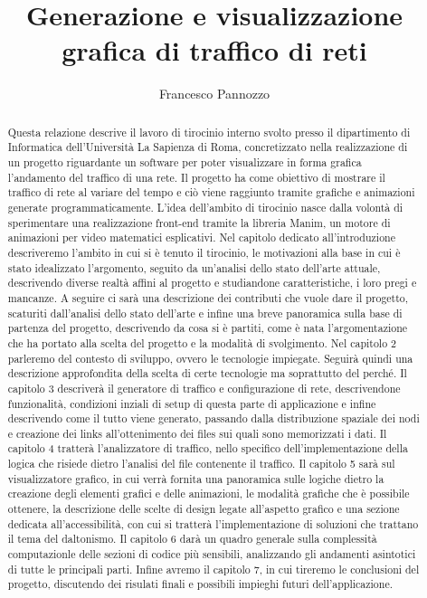 \documentclass[binding=0.6cm]{sapthesis}
\title{Generazione e visualizzazione grafica di traffico di reti}
\author{Francesco Pannozzo}
\begin{document}
\frontmatter
\maketitle
\dedication{Dedicato alla\\ mia famiglia}
\begin{abstract}
Questa relazione descrive il lavoro di tirocinio interno svolto presso il dipartimento di Informatica dell'Università La Sapienza di Roma, 
concretizzato nella realizzazione 
di un progetto riguardante un software per poter visualizzare in forma grafica l'andamento 
del traffico di una rete.
Il progetto ha come obiettivo di mostrare il traffico di rete al variare del tempo e ciò viene raggiunto
tramite grafiche e animazioni generate programmaticamente. L'idea dell'ambito di tirocinio nasce 
dalla volontà di sperimentare una realizzazione front-end tramite la libreria Manim, un motore di animazioni per video
matematici esplicativi. Nel capitolo dedicato all'introduzione descriveremo l'ambito in cui si è tenuto il tirocinio, le motivazioni
alla base in cui è stato idealizzato l'argomento, seguito da un'analisi dello stato dell'arte attuale, descrivendo diverse realtà affini al progetto
e studiandone caratteristiche, i loro pregi e mancanze. A seguire ci sarà una descrizione dei contributi che vuole dare il progetto, scaturiti dall'analisi
dello stato dell'arte e infine una breve panoramica sulla base di partenza del progetto, descrivendo da cosa si è partiti, come è nata l'argomentazione
che ha portato alla scelta del progetto e la modalità di svolgimento. Nel capitolo 2 parleremo del contesto di sviluppo, ovvero le tecnologie impiegate.
Seguirà quindi una descrizione approfondita della scelta di certe tecnologie ma soprattutto del perché. Il capitolo 3
descriverà il generatore di traffico e configurazione di rete, descrivendone funzionalità, condizioni inziali di setup di questa parte di applicazione e 
infine
descrivendo come il tutto viene generato, passando dalla distribuzione spaziale dei nodi e creazione dei links all'ottenimento dei files sui quali sono
 memorizzati i dati.
Il capitolo 4 tratterà l'analizzatore di traffico, nello specifico dell'implementazione della logica che risiede dietro l'analisi del file contenente il
 traffico.
Il capitolo 5 sarà sul visualizzatore grafico, in cui verrà fornita una panoramica sulle logiche dietro la creazione degli elementi grafici e delle 
animazioni, le modalità
grafiche che è possibile ottenere, la descrizione delle scelte di design legate all'aspetto grafico e una sezione dedicata all'accessibilità, con cui 
si tratterà
l'implementazione di soluzioni che trattano il tema del daltonismo. Il capitolo 6 darà un quadro generale sulla complessità computazionle delle sezioni 
di codice più sensibili, analizzando gli andamenti asintotici di tutte le principali parti.
Infine avremo il capitolo 7, in cui tireremo le conclusioni del progetto, discutendo dei risulati finali e possibili impieghi futuri dell'applicazione.

\end{abstract}
\tableofcontents
\mainmatter
\end{document}
